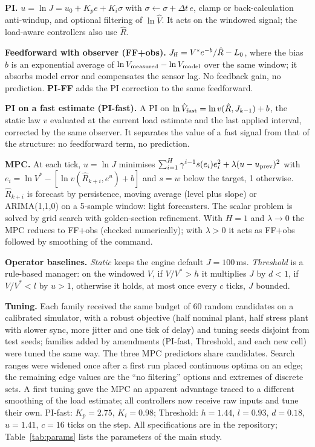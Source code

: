 \documentclass[journal]{IEEEtran}
\begin{document}
\textbf{PI.} $u=\ln J=u_0+K_pe+K_i\sigma$ with $\sigma\leftarrow\sigma+\Delta t\,e$, clamp or back-calculation anti-windup, and optional filtering of $\ln\hat V$. It acts on the windowed signal; the load-aware controllers also use $\hat R$.

\textbf{Feedforward with observer (FF+obs).} $J_{\rm ff}=V^*e^{-b}/\hat R-L_0$, where the bias $b$ is an exponential average of $\ln V_{\rm measured}-\ln V_{\rm model}$ over the same window; it absorbs model error and compensates the sensor lag. No feedback gain, no prediction. \textbf{PI-FF} adds the PI correction to the same feedforward.

\textbf{PI on a fast estimate (PI-fast).} A PI on $\ln\hat V_{\rm fast}=\ln v(\hat R,J_{k-1})+b$, the static law $v$ evaluated at the current load estimate and the last applied interval, corrected by the same observer. It separates the value of a fast signal from that of the structure: no feedforward term, no prediction.

\textbf{MPC.} At each tick, $u=\ln J$ minimises $\sum_{i=1}^{H}\gamma^{i-1}s(e_i)e_i^2+\lambda(u-u_{\rm prev})^2$ with $e_i=\ln V^*-[\ln v(\hat R_{k+i},e^{u})+b]$ and $s=w$ below the target, 1 otherwise. $\hat R_{k+i}$ is forecast by persistence, moving average (level plus slope) or ARIMA(1,1,0) on a 5-sample window: light forecasters. The scalar problem is solved by grid search with golden-section refinement. With $H=1$ and $\lambda\to0$ the MPC reduces to FF+obs (checked numerically); with $\lambda>0$ it acts as FF+obs followed by smoothing of the command.

\textbf{Operator baselines.} \emph{Static} keeps the engine default $J=100$\,ms. \emph{Threshold} is a rule-based manager: on the windowed $V$, if $V/V^*>h$ it multiplies $J$ by $d<1$, if $V/V^*<l$ by $u>1$, otherwise it holds, at most once every $c$ ticks, $J$ bounded.

\textbf{Tuning.} Each family received the same budget of 60 random candidates on a calibrated simulator, with a robust objective (half nominal plant, half stress plant with slower sync, more jitter and one tick of delay) and tuning seeds disjoint from test seeds; families added by amendments (PI-fast, Threshold, and each new cell) were tuned the same way. The three MPC predictors share candidates. Search ranges were widened once after a first run placed continuous optima on an edge; the remaining edge values are the ``no filtering'' options and extremes of discrete sets. A first tuning gave the MPC an apparent advantage traced to a different smoothing of the load estimate; all controllers now receive raw inputs and tune their own. PI-fast: $K_p=2.75$, $K_i=0.98$; Threshold: $h=1.44$, $l=0.93$, $d=0.18$, $u=1.41$, $c=16$ ticks on the step. All specifications are in the repository; Table~\ref{tab:params} lists the parameters of the main study.

\end{document}
